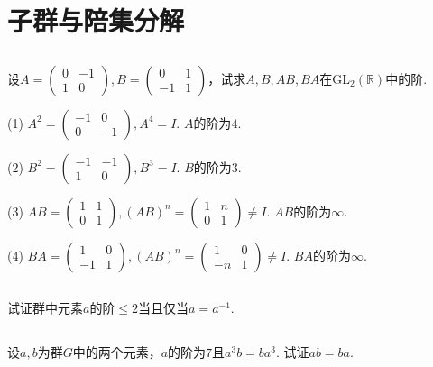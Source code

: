 \section{子群与陪集分解}
\subsection{}
设$A=
\begin{pmatrix}
0 & -1\\
1 & 0
\end{pmatrix},
B=
\begin{pmatrix}
0 & 1\\
-1 & 1
\end{pmatrix}
$，试求$A, B, AB, BA$在$\mathrm{GL}_2(\mathbb{R})$中的阶.

\jie
(1)
$A^2=
\begin{pmatrix}
-1 & 0\\
0 & -1
\end{pmatrix},
A^4=I$.
$A$的阶为$4$.

(2)
$B^2=
\begin{pmatrix}
-1 & -1\\
1 & 0
\end{pmatrix},
B^3=I$.
$B$的阶为$3$.

(3)
$AB=
\begin{pmatrix}
1 & 1\\
0 & 1
\end{pmatrix},
(AB)^n=
\begin{pmatrix}
1 & n\\
0 & 1
\end{pmatrix}
\neq I$.
$AB$的阶为$\infty$.

(4)
$BA=
\begin{pmatrix}
1 & 0\\
-1 & 1
\end{pmatrix},
(AB)^n=
\begin{pmatrix}
1 & 0\\
-n & 1
\end{pmatrix}
\neq I$.
$BA$的阶为$\infty$.

\subsection{}
试证群中元素$a$的阶$\leq 2$当且仅当$a=a^{-1}$.

\Proofbyintimidation

\subsection{}
设$a,b$为群$G$中的两个元素，$a$的阶为$7$且$a^3b=ba^3$. 试证$ab=ba$.


